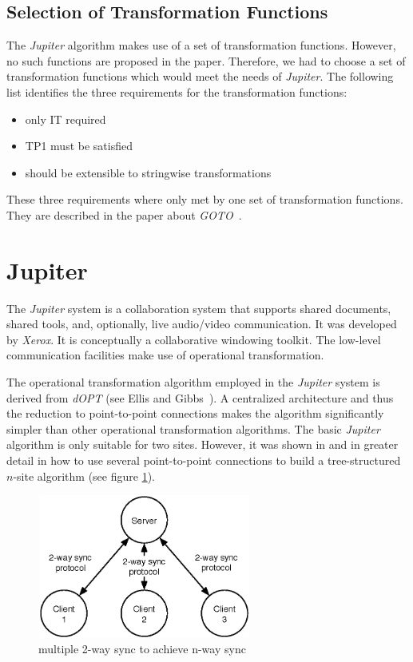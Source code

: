 \subsection{Selection of Transformation Functions}
The \emph{Jupiter} algorithm makes use of a set of transformation functions.
However, no such functions are proposed in the paper. Therefore, we had to 
choose a set of transformation functions which would meet the needs of 
\emph{Jupiter}. The following list identifies the three requirements for the 
transformation functions:

\begin{itemize}
 \item only IT required
 \item TP1 must be satisfied
 \item should be extensible to stringwise transformations
\end{itemize}

These three requirements where only met by one set of transformation
functions. They are described in the paper about \emph{GOTO}~\cite{sun98a}.



\section{Jupiter}
The \emph{Jupiter} system is a collaboration system that supports shared 
documents, shared tools, and, optionally, live audio/video communication. It was 
developed by \emph{Xerox}. It is conceptually a collaborative windowing toolkit. 
The low-level communication facilities make use of operational transformation.

The operational transformation algorithm employed in the \emph{Jupiter} system is derived from \emph{dOPT} (see {Ellis and Gibbs}~\cite{ellis}). A centralized architecture and thus the reduction to point-to-point connections makes the algorithm significantly simpler than other operational transformation algorithms. The basic \emph{Jupiter} algorithm is only suitable for two sites. However, it was shown in \cite{jupiter95} and in greater detail in \cite{netedit:thesis} how to use several point-to-point connections to build a tree-structured $n$-site algorithm (see figure \ref{fig:algorithm.nway}).

\begin{figure}[htb]
 \centering
 \includegraphics[width=7cm,height=4.72cm]{../images/finalreport/algorithm_nway.eps}
 \caption{multiple 2-way sync to achieve n-way sync}
 \label{fig:algorithm.nway}
\end{figure}

